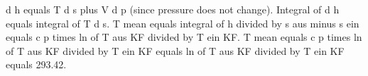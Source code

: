d h equals T d s plus V d p (since pressure does not change).  
Integral of d h equals integral of T d s.  
T mean equals integral of h divided by s aus minus s ein equals c p times ln of T aus KF divided by T ein KF.  
T mean equals c p times ln of T aus KF divided by T ein KF equals ln of T aus KF divided by T ein KF equals 293.42.